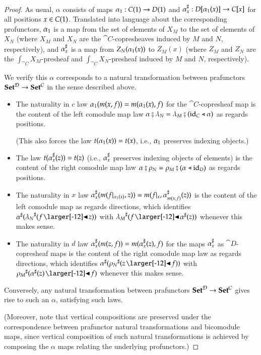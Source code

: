 \documentclass{amsart}
\begin{document}
\begin{proof}
  As usual, $\alpha$ consists of maps
  ${\alpha}_1: C(1) \to D(1)$ and
  ${\alpha}^\sharp_{x}: D[{\alpha}_1(x)] \to C[x]$
  for all positions $x \in C(1)$. Translated into language about
  the corresponding profunctors, ${\alpha}_1$ is a map from the
  set of elements of $X_M$ to the set of elements of $X_N$ (where
  $X_M$ and $X_N$ are the $\cat{C}$-copresheaves induced by $M$ and
  $N$, respectively), and ${\alpha}^\sharp_{x}$ is a map from
  $Z_N({\alpha}_1(x))$ to $Z_M(x)$ (where $Z_M$ and $Z_N$ are
  the $\int_{\cat{C}}X_M$-presheaf and $\int_{\cat{C}}X_N$-presheaf
  induced by $M$ and $N$, respectively).

  We verify this $\alpha$ corresponds to a natural transformation
  between prafunctors ${\normalfont\mathbf{Set}}^{\mathcal{D}} \to {\normalfont\mathbf{Set}}^{\mathcal{C}}$ in the sense
  described above.
  \begin{itemize}
  \item The naturality in $c$ law
    ${\alpha}_1(m(x,f)) = m({\alpha}_1(x),f)$ for the
    $\cat{C}$-copresheaf map is the content of the left comodule map
    law
    $\alpha \fatsemi \lambda_N = \lambda_M \fatsemi (\mathrm{id}_C \mathrel{\triangleleft}
    \alpha)$ as regards positions.
    
    (This also forces the law $t({\alpha}_1(x)) = t(x)$, i.e.,
    ${\alpha}_1$ preserves indexing objects.)
  \item The law $t({\alpha}^\sharp_{x}(z)) = t(z)$ (i.e.,
    ${\alpha}^\sharp_{x}$ preserves indexing objects of elements)
    is the content of the right comodule map law
    $\alpha \fatsemi \rho_N = \rho_M \fatsemi (\alpha \mathrel{\triangleleft} \mathrm{id}_D)$ as
    regards positions.
  \item The naturality in $x$ law
    ${\alpha}^\sharp_{x}(m(f|_{{\alpha}_1(x)}, z)) =
    m(f|_{x}, {\alpha}^\sharp_{m(x, f)}(z))$ is the content of the
    left comodule map as regards directions, which identifies
    ${\anydirmapof{\alpha}{\anydirmapof{\lambda_N}{f \subd z}}}$ with
    $\anydirmapof{\lambda_M}{f \subd \anydirmapof{\alpha}{z}}$ whenever
    this makes sense.
  \item The naturality in $d$ law
    ${\alpha}^\sharp_{x}(m(z, f)) = m({\alpha}^\sharp_{x}(z), f)$
    for the maps ${\alpha}^\sharp_{x}$ as $\cat{D}$-copresheaf maps is
    the content of the right comodule map law as regards directions,
    which identifies
    $\anydirmapof{\alpha}{\anydirmapof{\rho_N}{z \subd f}}$ with
    $\anydirmapof{\rho_M}{\anydirmapof{\alpha}{z} \subd f}$ whenever
    this makes sense.
  \end{itemize}

  Conversely, any natural transformation between prafunctors
  ${\normalfont\mathbf{Set}}^{\mathcal{D}} \to {\normalfont\mathbf{Set}}^{\mathcal{C}}$ gives rise to such an $\alpha$,
  satisfying such laws.

  (Moreover, note that vertical compositions are preserved under the
  correspondence between prafunctor natural transformations and
  bicomodule maps, since vertical composition of such natural
  transformations is achieved by composing the $\alpha$ maps relating
  the underlying profunctors.)
\end{proof}
\end{document}
